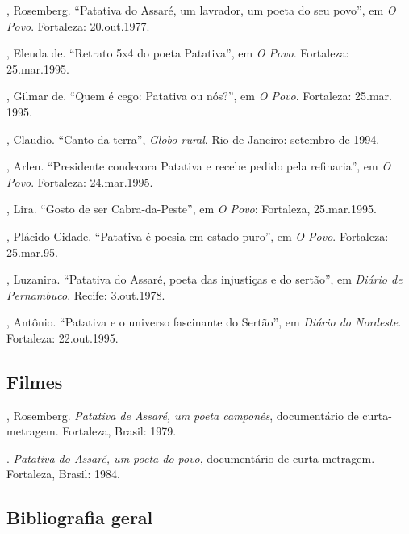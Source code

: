 \begin{bibliohedra}[]

, Rosemberg. “Patativa do Assaré, um lavrador, um 
poeta do seu povo”, em \textit{O Povo}. Fortaleza: 20.out.1977.

, Eleuda de. “Retrato 5x4 do poeta Patativa”, em
\textit{O Povo}. Fortaleza: 25.mar.1995.

, Gilmar de. “Quem é cego: Patativa ou nós?”, 
em \textit{O Povo}. Fortaleza: 25.mar. 1995.

, Claudio. “Canto da terra”, \textit{Globo rural}.
Rio de Janeiro: setembro de 1994.

, Arlen. “Presidente condecora Patativa e 
recebe pedido pela refinaria”, em \textit{O Povo}. Fortaleza:
24.mar.1995.

, Lira. “Gosto de ser Cabra-da-Peste”, em \textit{O Povo}: Fortaleza,
25.mar.1995.

, Plácido Cidade. “Patativa é poesia em estado 
puro”, em \textit{O Povo}. Fortaleza: 25.mar.95.

, Luzanira. “Patativa do Assaré, poeta das injustiças
e do sertão”, em \textit{Diário de Pernambuco}. Recife: 3.out.1978.

, Antônio. “Patativa e o universo fascinante
do Sertão”, em \textit{Diário do Nordeste}. Fortaleza: 22.out.1995.

\end{bibliohedra}

\subsection{Filmes}

\begin{bibliohedra}[]

, Rosemberg. \textit{Patativa de Assaré, um poeta
camponês}, documentário de curta-metragem. Fortaleza, Brasil: 1979.

\titidem. \textit{Patativa do Assaré, um poeta do povo}, documentário
de curta-metragem. Fortaleza, Brasil: 1984.

\end{bibliohedra}

\subsection{Bibliografia geral}

